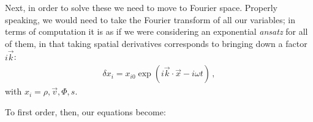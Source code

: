 \documentclass[main.tex]{subfiles}
\begin{document}




Next, in order to solve these we need to move to Fourier space. Properly speaking, we would need to take the Fourier transform of all our variables; in terms of computation it is as if we were considering an exponential \emph{ansatz} for all of them, in that taking spatial derivatives corresponds to bringing down a factor \(i \vec{k}\): 
%
\begin{align}
  \delta x_i = x_{i0} \exp( i \vec{k} \cdot \vec{x} - i \omega t)
\,,
\end{align}
%
with \(x_{i} = \rho, \vec{v}, \Phi , s\). 

To first order, then, our equations become: 
%
\end{document}
